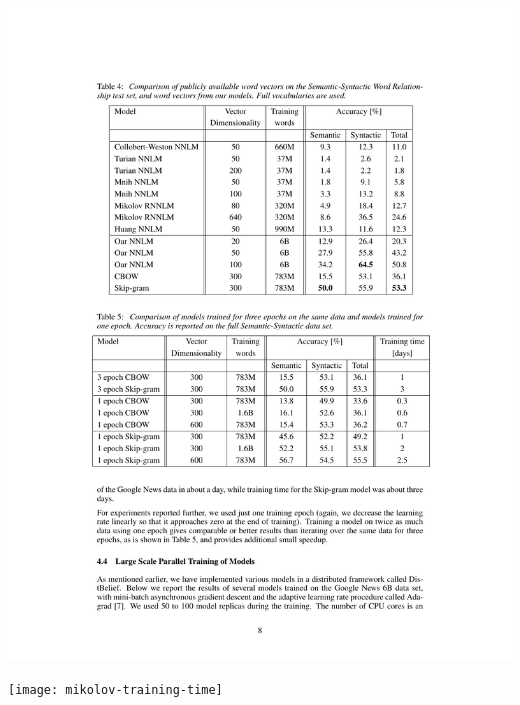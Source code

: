\documentclass{beamer}
\begin{document}
\begin{frame}
\includegraphics[width=\linewidth]{mikolov-results2}
\end{frame}

\begin{frame}
\texttt{[image: mikolov-training-time]}
\end{frame}
\end{document}
